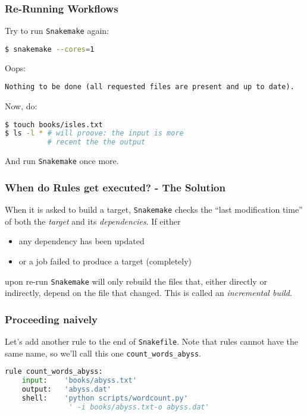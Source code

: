 \begin{frame}[fragile]
  \frametitle{Re-Running Workflows}
  Try to run \texttt{Snakemake} again:
  \begin{lstlisting}[language=Bash, style=Shell]
$ snakemake --cores=1
  \end{lstlisting}
  \pause
  Oops:
  \begin{lstlisting}[style=Plain, basicstyle=\footnotesize]
Nothing to be done (all requested files are present and up to date).
  \end{lstlisting}
  \pause
  Now, do:
  \begin{lstlisting}[language=Bash, style=Shell]
$ touch books/isles.txt
$ ls -l * # will proove: the input is more 
          # recent the the output
  \end{lstlisting}
  And run \texttt{Snakemake} once more.
\end{frame}

\begin{frame}
  \frametitle{When do Rules get executed? - The Solution}
  When it is asked to build a target, \texttt{Snakemake} checks the “last modification time” of both the \emph{target} and its \emph{dependencies}.
  If either
  \begin{itemize}
   \item any dependency has been updated
   \item or a job failed to produce a target (completely)
  \end{itemize}
  upon re-run \texttt{Snakemake} will only rebuild the files that, either directly or indirectly, depend on the file that changed. This is called an \emph{incremental build}.
  \pause
\end{frame}

\begin{frame}[fragile]
  \frametitle{Proceeding naively}
  Let’s add another rule to the end of \texttt{Snakefile}. Note that rules cannot have the same name, so we’ll call this one \texttt{count\_words\_abyss}.
  \begin{lstlisting}[language=Python,style=Python]
rule count_words_abyss:
    input:    'books/abyss.txt'
    output:   'abyss.dat'
    shell:    'python scripts/wordcount.py' 
               ' -i books/abyss.txt-o abyss.dat'
  \end{lstlisting}
\end{frame}

